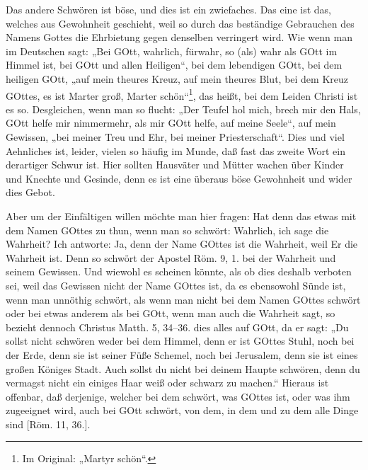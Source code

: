Das andere Schwören ist böse, und dies ist ein zwiefaches. Das eine ist das, welches aus Gewohnheit geschieht, weil so durch das beständige Gebrauchen des Namens Gottes die Ehrbietung gegen denselben verringert wird. Wie wenn man im Deutschen sagt: „Bei GOtt, wahrlich, fürwahr, so (als) wahr als GOtt im Himmel ist, bei GOtt und allen Heiligen“, bei dem lebendigen GOtt, bei dem heiligen GOtt, „auf mein theures Kreuz, auf mein theures Blut, bei dem Kreuz GOttes, es ist Marter groß, Marter schön“\footnote{Im Original: „Martyr schön“.}, das heißt, bei dem Leiden Christi ist es so. Desgleichen, wenn man so flucht: „Der Teufel hol mich, brech mir den Hals, GOtt helfe mir nimmermehr, als mir GOtt helfe, auf meine Seele“, auf mein Gewissen, „bei meiner Treu und Ehr, bei meiner Priesterschaft“. Dies und viel Aehnliches ist, leider, vielen so häufig im Munde, daß fast das zweite Wort ein derartiger Schwur ist. Hier sollten Hausväter und Mütter wachen über Kinder und Knechte und Gesinde, denn es ist eine überaus böse Gewohnheit und wider dies Gebot.

Aber um der Einfältigen willen möchte man hier fragen: Hat denn das etwas mit dem Namen GOttes zu thun, wenn man so schwört: Wahrlich, ich sage die Wahrheit? Ich antworte: Ja, denn der Name GOttes ist die Wahrheit, weil Er die Wahrheit ist. Denn so schwört der Apostel Röm. 9, 1. bei der Wahrheit und seinem Gewissen. Und wiewohl es scheinen könnte, als ob dies deshalb verboten sei, weil das Gewissen nicht der Name GOttes ist, da es ebensowohl Sünde ist, wenn man unnöthig schwört, als wenn man nicht bei dem Namen GOttes schwört oder bei etwas anderem als bei GOtt, wenn man auch die Wahrheit sagt, so bezieht dennoch Christus Matth. 5, 34–36. dies alles auf GOtt, da er sagt: „Du sollst nicht schwören weder bei dem Himmel, denn er ist GOttes Stuhl, noch bei der Erde, denn sie ist seiner Füße Schemel, noch bei Jerusalem, denn sie ist eines großen Königes Stadt. Auch sollst du nicht bei deinem Haupte schwören, denn du vermagst nicht ein einiges Haar weiß oder schwarz zu machen.“ Hieraus ist offenbar, daß derjenige, welcher bei dem schwört, was GOttes ist, oder was ihm zugeeignet wird, auch bei GOtt schwört, von dem, in dem und zu dem alle Dinge sind [Röm. 11, 36.].

